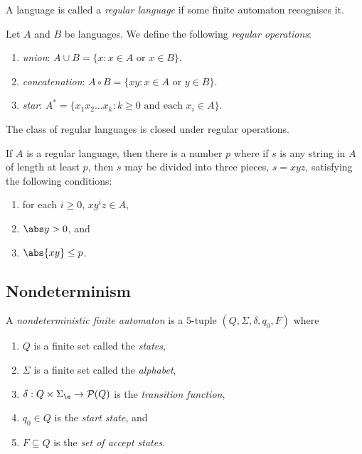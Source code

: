 \documentclass{article}
\begin{document}
\begin{definition}[Sipser p. 40]
    A language is called a \emph{regular language} if some finite automaton recognises it.
\end{definition}

\begin{definition}[Sipser p. 44]
    Let $A$ and $B$ be languages. We define the following \emph{regular operations}:
    \begin{enumerate}
        \item \emph{union}: $A\cup B=\{x : x \in A \text{ or } x \in B\}$.
        \item \emph{concatenation}: $A\circ B=\{xy : x \in A \text{ or } y \in B\}$.
        \item \emph{star}: $A^* = \{x_1x_2\dots x_k:k\geq 0 \text{ and each }x_i\in A\}$.
    \end{enumerate}
\end{definition}

\begin{theorem}[Sipser p. 45, 60, 62]
    The class of regular languages is closed under regular operations.
\end{theorem}

\begin{theorem}
    If $A$ is a regular language, then there is a number $p$ where if $s$
    is any string in $A$ of length at least $p$, then $s$ may be divided 
    into three pieces, $s=xyz$, satisfying the following conditions:
    \begin{enumerate}
        \item for each $i\geq 0$, $xy^iz\in A$,
        \item $\abs y > 0$, and 
        \item $\abs{xy} \leq p$.
    \end{enumerate} 
\end{theorem}

\subsection{Nondeterminism}

\begin{definition}[Sipser p. 53]
    A \emph{nondeterministic finite automaton} is a $5$-tuple $(Q,\Sigma,\delta,q_0,F)$ where 
    \begin{enumerate}
        \item $Q$ is a finite set called the \emph{states},
        \item $\Sigma$ is a finite set called the \emph{alphabet},
        \item $\delta:Q\times\Sigma_\e\to \mathcal{P}(Q)$ is the \emph{transition function},
        \item $q_0\in Q$ is the \emph{start state}, and 
        \item $F\subseteq Q$ is the \emph{set of accept states}.
    \end{enumerate} 
\end{definition}
\end{document}
